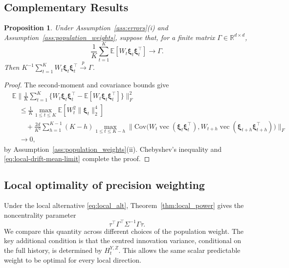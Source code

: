 \documentclass[12pt]{article}
\def\E{\mathbb{E}}
\newtheorem{proposition}[theorem]{Proposition}
\newcommand{\Cov}{\mathrm{Cov}}
\numberwithin{equation}{section}
\begin{document}
\subsection{Complementary Results}



\begin{proposition}
\label{prop:Sigma_xi}
Under Assumption~\ref{ass:errors}(i) and
Assumption~\ref{ass:population_weights}, suppose that, for a finite matrix
\(\Gamma\in\mathbb R^{d\times d}\),
\begin{equation}
\label{eq:local-drift-mean-limit}
\frac1K\sum_{t=1}^K\E[W_t\boldsymbol\xi_t\boldsymbol\xi_t^\top]
\rightarrow\Gamma.
\end{equation}
Then \(K^{-1}\sum_{t=1}^K
W_t\boldsymbol\xi_t\boldsymbol\xi_t^\top\xrightarrow{p}\Gamma\).
\end{proposition}

\begin{proof}
The second-moment and covariance bounds give
\begin{align*}
&\E\Big\|\frac1K\sum_{t=1}^K
\big\{W_t\boldsymbol\xi_t\boldsymbol\xi_t^\top
-\E[W_t\boldsymbol\xi_t\boldsymbol\xi_t^\top]\big\}\Big\|_F^2\\
&\quad\leq\frac1K\max_{1\leq t\leq K}
\E[W_t^2\|\boldsymbol\xi_t\|_2^4]\\
&\qquad+\frac{2d}{K^2}\sum_{h=1}^{K-1}(K-h)
\max_{1\leq t\leq K-h}\Big\|\Cov\big(
W_t\operatorname{vec}(\boldsymbol\xi_t\boldsymbol\xi_t^\top),
W_{t+h}\operatorname{vec}(\boldsymbol\xi_{t+h}\boldsymbol\xi_{t+h}^\top)
\big)\Big\|_F\\
&\quad \rightarrow0,
\end{align*}
by Assumption~\ref{ass:population_weights}(ii).
Chebyshev's inequality and \eqref{eq:local-drift-mean-limit} complete the proof.
\end{proof}




\subsection{Local optimality of precision weighting}

Under the local alternative \eqref{eq:local_alt}, Theorem~\ref{thm:local_power}
gives the noncentrality parameter
\begin{equation}
    {\tau^\top\Gamma^\top\Sigma^{-1}\Gamma\tau.}
    \label{eq:weighted-local-noncentrality}
\end{equation}
We compare this quantity across different choices of the population weight. The key additional condition is that the centred innovation
variance, conditional on the full history, is determined by \(H_t^{Y,Z}\).
This allows the same scalar predictable weight to be optimal for every local
direction.
\end{document}
